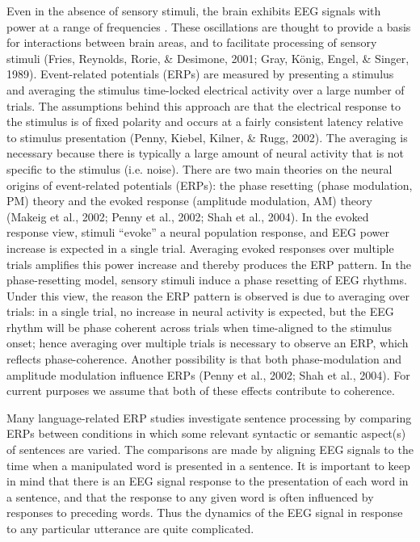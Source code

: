 Even in the absence of sensory stimuli, the brain exhibits EEG signals with power at a range of frequencies \citep{Buzsaki2006}. These oscillations are thought to provide a basis for interactions between brain areas, and to facilitate processing of sensory stimuli (Fries, Reynolds, Rorie, \& Desimone, 2001; Gray, König, Engel, \& Singer, 1989). Event-related potentials (ERPs) are measured by presenting a stimulus and averaging the stimulus time-locked electrical activity over a large number of trials. The assumptions behind this approach are that the electrical response to the stimulus is of fixed polarity and occurs at a fairly consistent latency relative to stimulus presentation (Penny, Kiebel, Kilner, \& Rugg, 2002). The averaging is necessary because there is typically a large amount of neural activity that is not specific to the stimulus (i.e. noise). There are two main theories on the neural origins of event-related potentials (ERPs): the phase resetting (phase modulation, PM) theory and the evoked response (amplitude modulation, AM) theory (Makeig et al., 2002; Penny et al., 2002; Shah et al., 2004). In the evoked response view, stimuli “evoke” a neural population response, and EEG power increase is expected in a single trial. Averaging evoked responses over multiple trials amplifies this power increase and thereby produces the ERP pattern. In the phase-resetting model, sensory stimuli induce a phase resetting of EEG rhythms. Under this view, the reason the ERP pattern is observed is due to averaging over trials: in a single trial, no increase in neural activity is expected, but the EEG rhythm will be phase coherent across trials when time-aligned to the stimulus onset; hence averaging over multiple trials is necessary to observe an ERP, which reflects phase-coherence. Another possibility is that both phase-modulation and amplitude modulation influence ERPs (Penny et al., 2002; Shah et al., 2004). For current purposes we assume that both of these effects contribute to coherence. 

  Many language-related ERP studies investigate sentence processing by comparing ERPs between conditions in which some relevant syntactic or semantic aspect(s) of sentences are varied. The comparisons are made by aligning EEG signals to the time when a manipulated word is presented in a sentence. It is important to keep in mind that there is an EEG signal response to the presentation of each word in a sentence, and that the response to any given word is often influenced by responses to preceding words. Thus the dynamics of the EEG signal in response to any particular utterance are quite complicated. 

